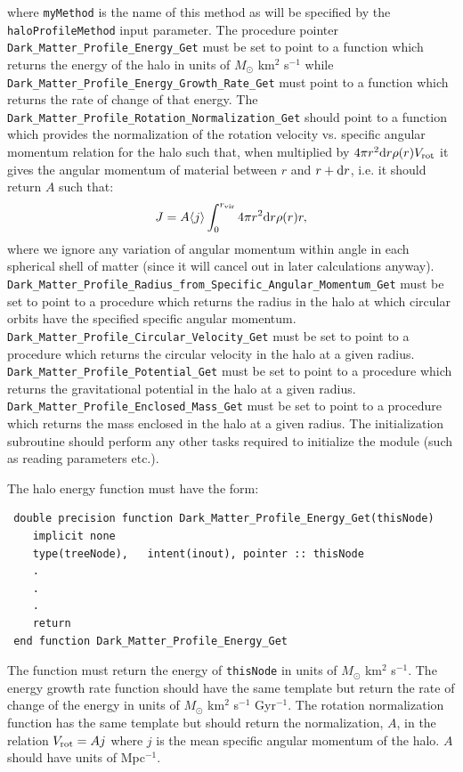 where {\tt myMethod} is the name of this method as will be specified by the {\tt haloProfileMethod} input parameter. The procedure pointer {\tt Dark\_Matter\_Profile\_Energy\_Get} must be set to point to a function which returns the energy of the halo in units of $M_\odot$ km$^2$ s$^{-1}$ while {\tt Dark\_Matter\_Profile\_Energy\_Growth\_Rate\_Get} must point to a function which returns the rate of change of that energy. The {\tt Dark\_Matter\_Profile\_Rotation\_Normalization\_Get} should point to a function which provides the normalization of the rotation velocity vs. specific angular momentum relation for the halo such that, when multiplied by $4 \pi r^2 \d r \rho(r) V_{\rm rot}$ it gives the angular momentum of material between $r$ and $r+\d r$, i.e. it should return $A$ such that:
\begin{equation}
 J = A \langle j \rangle \int_0^{r_{\rm vir}} 4 \pi r^2 \d r \rho(r) r,
\end{equation}
where we ignore any variation of angular momentum within angle in each spherical shell of matter (since it will cancel out in later calculations anyway). {\tt Dark\_Matter\_Profile\_Radius\_from\_Specific\_Angular\_Momentum\_Get} must be set to point to a procedure which returns the radius in the halo at which circular orbits have the specified specific angular momentum. {\tt Dark\_Matter\_Profile\_Circular\_Velocity\_Get} must be set to point to a procedure which returns the circular velocity in the halo at a given radius.  {\tt Dark\_Matter\_Profile\_Potential\_Get} must be set to point to a procedure which returns the gravitational potential in the halo at a given radius.  {\tt Dark\_Matter\_Profile\_Enclosed\_Mass\_Get} must be set to point to a procedure which returns the mass enclosed in the halo at a given radius. The initialization subroutine should perform any other tasks required to initialize the module (such as reading parameters etc.).

The halo energy function must have the form:
\begin{verbatim}
 double precision function Dark_Matter_Profile_Energy_Get(thisNode)
    implicit none
    type(treeNode),   intent(inout), pointer :: thisNode
    .
    .
    .
    return
 end function Dark_Matter_Profile_Energy_Get
\end{verbatim}
The function must return the energy of {\tt thisNode} in units of $M_\odot$ km$^2$ s$^{-1}$. The energy growth rate function should have the same template but return the rate of change of the energy in units of $M_\odot$ km$^2$ s$^{-1}$ Gyr$^{-1}$. The rotation normalization function has the same template but should return the normalization, $A$, in the relation $V_{\rm rot} = A j$ where $j$ is the mean specific angular momentum of the halo. $A$ should have units of Mpc$^{-1}$.

